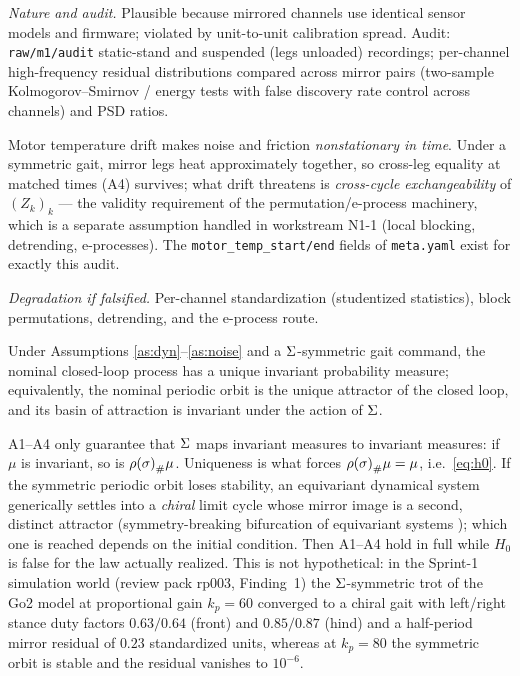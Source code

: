 \emph{Nature and audit.} Plausible because mirrored channels use identical
sensor models and firmware; violated by unit-to-unit calibration spread.
Audit: \texttt{raw/m1/audit} static-stand and suspended (legs unloaded)
recordings; per-channel high-frequency residual distributions compared across
mirror pairs (two-sample Kolmogorov--Smirnov / energy tests with false
discovery rate control across channels) and PSD ratios.

\begin{remark}
\label{rem:temp}
Motor temperature drift makes noise and friction \emph{nonstationary in
time}. Under a symmetric gait, mirror legs heat approximately together, so
cross-leg equality at matched times (A4) survives; what drift threatens is
\emph{cross-cycle exchangeability} of $(Z_k)_k$ --- the validity requirement
of the permutation/e-process machinery, which is a separate assumption
handled in workstream N1-1 (local blocking, detrending, e-processes). The
\texttt{motor\_temp\_start/end} fields of \texttt{meta.yaml} exist for exactly
this audit.
\end{remark}

\emph{Degradation if falsified.} Per-channel standardization (studentized
statistics), block permutations, detrending, and the e-process route.

\begin{assumption}
\label{as:erg}
Under Assumptions \ref{as:dyn}--\ref{as:noise} and a $\Sigma$-symmetric gait
command, the nominal closed-loop process has a unique invariant probability
measure; equivalently, the nominal periodic orbit is the unique attractor of
the closed loop, and its basin of attraction is invariant under the action of
$\Sigma$.
\end{assumption}

\begin{remark}
\label{rem:bifurcation}
A1--A4 only guarantee that $\Sigma$ maps invariant measures to invariant
measures: if $\mu$ is invariant, so is ${\rho(\sigma)}_{\#}\mu$. Uniqueness is
what forces ${\rho(\sigma)}_{\#}\mu = \mu$, i.e.\ \eqref{eq:h0}. If the
symmetric periodic orbit loses stability, an equivariant dynamical system
generically settles into a \emph{chiral} limit cycle whose mirror image is a
second, distinct attractor (symmetry-breaking bifurcation of equivariant
systems \cite{golubitsky2002symmetry}); which one is reached depends on the
initial condition. Then A1--A4 hold in full while $H_0$ is false for the law
actually realized. This is not hypothetical: in the Sprint-1 simulation world
(review pack rp003, Finding~1) the $\Sigma$-symmetric trot of the Go2 model
at proportional gain $k_p = 60$ converged to a chiral gait with left/right
stance duty factors $0.63/0.64$ (front) and $0.85/0.87$ (hind) and a
half-period mirror residual of $0.23$ standardized units, whereas at
$k_p = 80$ the symmetric orbit is stable and the residual vanishes to
$10^{-6}$.
\end{remark}

